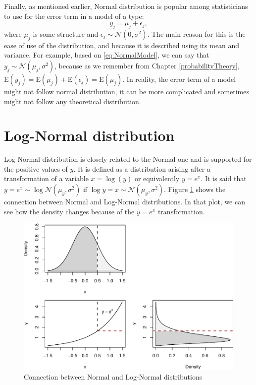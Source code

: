 \documentclass[
]{book}
\theoremstyle{definition}
\theoremstyle{definition}
\theoremstyle{definition}
\theoremstyle{definition}
\theoremstyle{remark}
\begin{document}
Finally, as mentioned earlier, Normal distribution is popular among statisticians to use for the error term in a model of a type:
\begin{equation}
    y_j = \mu_j + \epsilon_j,
    \label{eq:NormalModel}
\end{equation}
where \(\mu_j\) is some structure and \(\epsilon_j \sim \mathcal{N}(0, \sigma^2)\). The main reason for this is the ease of use of the distribution, and because it is described using its mean and variance. For example, based on \eqref{eq:NormalModel}, we can say that \(y_j \sim \mathcal{N}(\mu_j, \sigma^2)\), because as we remember from Chapter \ref{probabilityTheory}, \(\mathrm{E}(y_j)=\mathrm{E}(\mu_j) + \mathrm{E}(\epsilon_j)=\mathrm{E}(\mu_j)\). In reality, the error term of a model might not follow normal distribution, it can be more complicated and sometimes might not follow any theoretical distribution.

\hypertarget{distributionLogNormal}{%
\section{Log-Normal distribution}\label{distributionLogNormal}}

Log-Normal distribution is closely related to the Normal one and is supported for the positive values of \(y\). It is defined as a distribution arising after a transformation of a variable \(x=\log(y)\) or equivalently \(y=e^x\). It is said that \(y=e^x \sim \log\mathcal{N}(\mu_y, \sigma^2)\) if \(\log y = x \sim \mathcal{N}(\mu_y, \sigma^2)\). Figure \ref{fig:normalLogConnection} shows the connection between Normal and Log-Normal distributions. In that plot, we can see how the density changes because of the \(y=e^x\) transformation.

\begin{figure}
\centering
\includegraphics{Svetunkov---Statistics-for-Business-Analytics_files/figure-latex/normalLogConnection-1.pdf}
\caption{\label{fig:normalLogConnection}Connection between Normal and Log-Normal distributions}
\end{figure}
\end{document}
